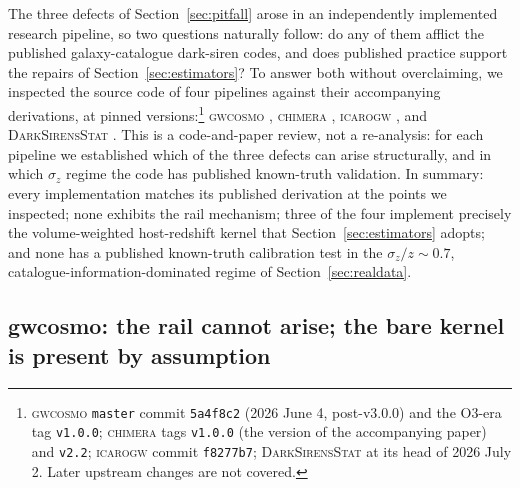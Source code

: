
The three defects of Section~\ref{sec:pitfall} arose in an independently implemented research pipeline, so two questions naturally follow: do any of them afflict the published galaxy-catalogue dark-siren codes, and does published practice support the repairs of Section~\ref{sec:estimators}? To answer both without overclaiming, we inspected the source code of four pipelines against their accompanying derivations, at pinned versions:\footnote{\textsc{gwcosmo} \texttt{master} commit \texttt{5a4f8c2} (2026 June 4, post-v3.0.0) and the O3-era tag \texttt{v1.0.0}; \textsc{chimera} tags \texttt{v1.0.0} (the version of the accompanying paper) and \texttt{v2.2}; \textsc{icarogw} commit \texttt{f8277b7}; \textsc{DarkSirensStat} at its head of 2026 July 2. Later upstream changes are not covered. %
} \textsc{gwcosmo} \citep{Gray:2019ksv, Gray:2021sew, Gray:2023wgj},
\textsc{chimera} \citep{Borghi:2023opd},
\textsc{icarogw} \citep{Mastrogiovanni:2023zbw},
and \textsc{DarkSirensStat} \citep{Finke:2021aom}.
This is a code-and-paper review, not a re-analysis: for each pipeline we established which of the three defects can arise structurally, and in which $\sigma_z$ regime the code has published known-truth validation. In summary: every implementation matches its published derivation at the points we inspected; none exhibits the rail mechanism; three of the four implement precisely the volume-weighted host-redshift kernel that Section~\ref{sec:estimators} adopts; and none has a published known-truth calibration test in the $\sigma_z/z \sim 0.7$, catalogue-information-dominated regime of Section~\ref{sec:realdata}. %

\subsection{gwcosmo: the rail cannot arise; the bare kernel is present by assumption}

